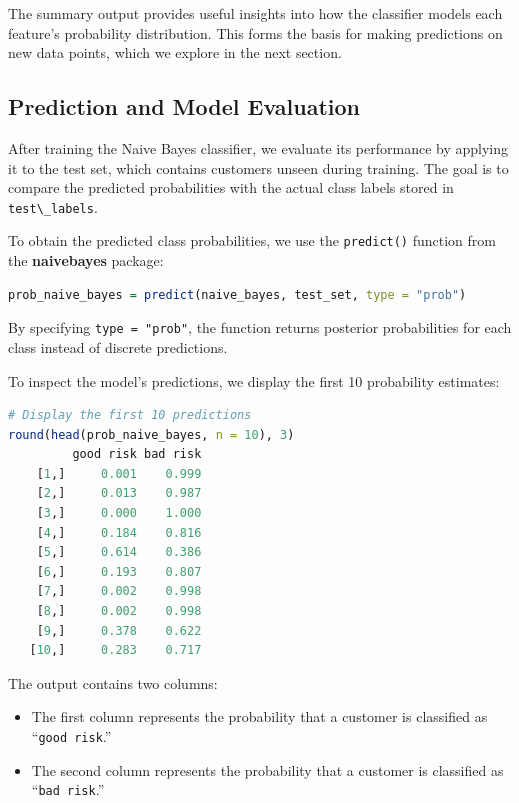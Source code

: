 \documentclass[
]{book}
\newcommand{\passthrough}[1]{#1}
\providecommand{\tightlist}{%
  \setlength{\itemsep}{0pt}\setlength{\parskip}{0pt}}
\theoremstyle{definition}
\theoremstyle{definition}
\theoremstyle{definition}
\theoremstyle{definition}
\theoremstyle{remark}
\begin{document}
The summary output provides useful insights into how the classifier models each feature's probability distribution. This forms the basis for making predictions on new data points, which we explore in the next section.

\subsection*{Prediction and Model Evaluation}\label{prediction-and-model-evaluation}

After training the Naive Bayes classifier, we evaluate its performance by applying it to the test set, which contains customers unseen during training. The goal is to compare the predicted probabilities with the actual class labels stored in \passthrough{\lstinline!test\_labels!}.

To obtain the predicted class probabilities, we use the \passthrough{\lstinline!predict()!} function from the \textbf{naivebayes} package:

\begin{lstlisting}[language=R]
prob_naive_bayes = predict(naive_bayes, test_set, type = "prob")
\end{lstlisting}

By specifying \passthrough{\lstinline!type = "prob"!}, the function returns posterior probabilities for each class instead of discrete predictions.

To inspect the model's predictions, we display the first 10 probability estimates:

\begin{lstlisting}[language=R]
# Display the first 10 predictions
round(head(prob_naive_bayes, n = 10), 3)
         good risk bad risk
    [1,]     0.001    0.999
    [2,]     0.013    0.987
    [3,]     0.000    1.000
    [4,]     0.184    0.816
    [5,]     0.614    0.386
    [6,]     0.193    0.807
    [7,]     0.002    0.998
    [8,]     0.002    0.998
    [9,]     0.378    0.622
   [10,]     0.283    0.717
\end{lstlisting}

The output contains two columns:

\begin{itemize}
\tightlist
\item
  The first column represents the probability that a customer is classified as ``\passthrough{\lstinline!good risk!}.''\\
\item
  The second column represents the probability that a customer is classified as ``\passthrough{\lstinline!bad risk!}.''
\end{itemize}
\end{document}

